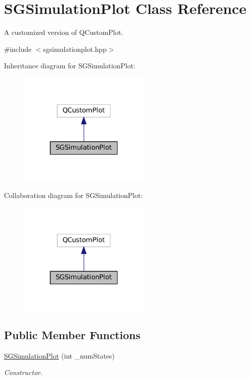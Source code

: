 \hypertarget{classSGSimulationPlot}{}\section{S\+G\+Simulation\+Plot Class Reference}
\label{classSGSimulationPlot}


A customized version of Q\+Custom\+Plot.  




{\ttfamily \#include $<$sgsimulationplot.\+hpp$>$}



Inheritance diagram for S\+G\+Simulation\+Plot\+:
\nopagebreak
\begin{figure}[H]
\begin{center}
\leavevmode
\includegraphics[width=181pt]{classSGSimulationPlot__inherit__graph}
\end{center}
\end{figure}


Collaboration diagram for S\+G\+Simulation\+Plot\+:
\nopagebreak
\begin{figure}[H]
\begin{center}
\leavevmode
\includegraphics[width=181pt]{classSGSimulationPlot__coll__graph}
\end{center}
\end{figure}
\subsection*{Public Member Functions}
\begin{DoxyCompactItemize}
\item 
\mbox{\label{classSGSimulationPlot_a85020912b296cab6b013b67f61670d75}} 
\hyperlink{classSGSimulationPlot_a85020912b296cab6b013b67f61670d75}{S\+G\+Simulation\+Plot} (int \+\_\+num\+States)
\begin{DoxyCompactList}\small\item\em Constructor. \end{DoxyCompactList}\end{DoxyCompactItemize}
